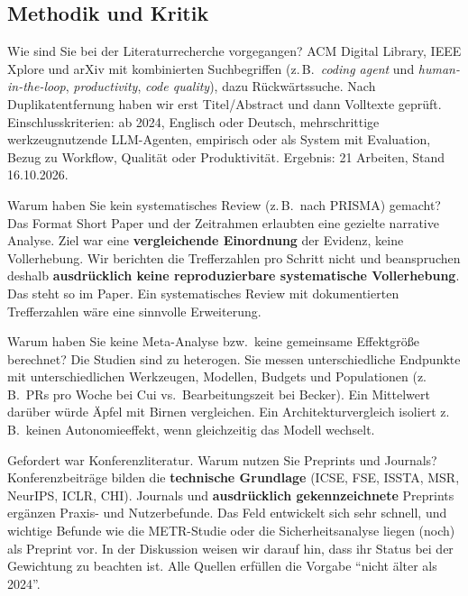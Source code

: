 \documentclass[12pt,a4paper]{article}
\begin{document}
\subsection{Methodik und Kritik}

\begin{qa}{Wie sind Sie bei der Literaturrecherche vorgegangen?}
ACM Digital Library, IEEE Xplore und arXiv mit kombinierten Suchbegriffen (z.\,B.\ \emph{coding agent} und \emph{human-in-the-loop}, \emph{productivity}, \emph{code quality}), dazu Rückwärtssuche. Nach Duplikatentfernung haben wir erst Titel/Abstract und dann Volltexte geprüft. Einschlusskriterien: ab 2024, Englisch oder Deutsch, mehrschrittige werkzeugnutzende LLM-Agenten, empirisch oder als System mit Evaluation, Bezug zu Workflow, Qualität oder Produktivität. Ergebnis: 21 Arbeiten, Stand 16.10.2026.
\end{qa}

\begin{qa}{Warum haben Sie kein systematisches Review (z.\,B.\ nach PRISMA) gemacht?}
Das Format Short Paper und der Zeitrahmen erlaubten eine gezielte narrative Analyse. Ziel war eine \textbf{vergleichende Einordnung} der Evidenz, keine Vollerhebung. Wir berichten die Trefferzahlen pro Schritt nicht und beanspruchen deshalb \textbf{ausdrücklich keine reproduzierbare systematische Vollerhebung}. Das steht so im Paper. Ein systematisches Review mit dokumentierten Trefferzahlen wäre eine sinnvolle Erweiterung.
\end{qa}

\begin{qa}{Warum haben Sie keine Meta-Analyse bzw.\ keine gemeinsame Effektgröße berechnet?}
Die Studien sind zu heterogen. Sie messen unterschiedliche Endpunkte mit unterschiedlichen Werkzeugen, Modellen, Budgets und Populationen (z.\,B.\ PRs pro Woche bei Cui vs.\ Bearbeitungszeit bei Becker). Ein Mittelwert darüber würde Äpfel mit Birnen vergleichen. Ein Architekturvergleich isoliert z.\,B.\ keinen Autonomieeffekt, wenn gleichzeitig das Modell wechselt.
\end{qa}

\begin{qa}{Gefordert war Konferenzliteratur. Warum nutzen Sie Preprints und Journals?}
Konferenzbeiträge bilden die \textbf{technische Grundlage} (ICSE, FSE, ISSTA, MSR, NeurIPS, ICLR, CHI). Journals und \textbf{ausdrücklich gekennzeichnete} Preprints ergänzen Praxis- und Nutzerbefunde. Das Feld entwickelt sich sehr schnell, und wichtige Befunde wie die METR-Studie oder die Sicherheitsanalyse liegen (noch) als Preprint vor. In der Diskussion weisen wir darauf hin, dass ihr Status bei der Gewichtung zu beachten ist. Alle Quellen erfüllen die Vorgabe \enquote{nicht älter als 2024}.
\end{qa}
\end{document}
